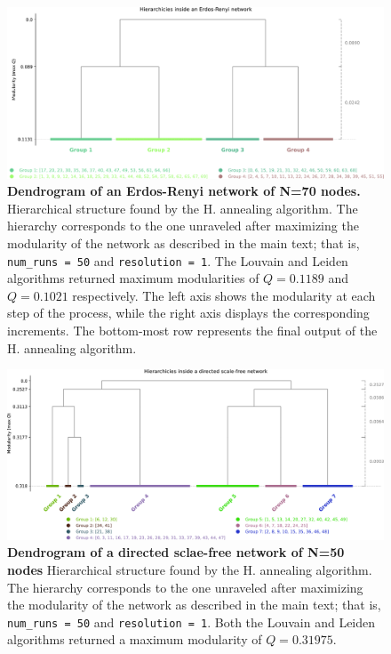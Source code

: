 \documentclass[pdflatex,sn-mathphys-num]{sn-jnl}%
\begin{document}
\begin{figure}[h]
    \centering
    \includegraphics[width=1\linewidth]{Figures/FigS5.pdf}
    \caption{\textbf{Dendrogram of an Erdos-Renyi network \cite{erdds1959random} of N=70 nodes.} Hierarchical structure found by the H. annealing algorithm. The hierarchy corresponds to the one unraveled after maximizing the modularity of the network as described in the main text; that is, {\tt num\_runs = 50} and {\tt resolution = 1}. The Louvain and Leiden algorithms returned maximum modularities of $Q=0.1189$ and $Q=0.1021$ respectively. The left axis shows the modularity at each step of the process, while the right axis displays the corresponding increments. The bottom-most row represents the final output of the H. annealing algorithm.}
    \label{fig:dendro_er}
\end{figure}

\begin{figure}[h]
    \centering
    \includegraphics[width=1\linewidth]{Figures/FigS6.pdf}
    \caption{\textbf{Dendrogram of a directed sclae-free network \cite{bollobas2003} of N=50 nodes} Hierarchical structure found by the H. annealing algorithm. The hierarchy corresponds to the one unraveled after maximizing the modularity of the network as described in the main text; that is, {\tt num\_runs = 50} and {\tt resolution = 1}. Both the Louvain and Leiden algorithms returned a maximum modularity of $Q=0.31975$.}
    \label{fig:dendro_er}
\end{figure}
\end{document}
